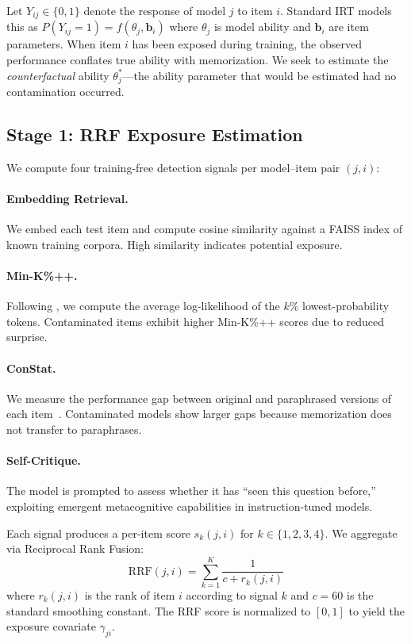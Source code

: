 \documentclass[11pt,letterpaper]{article}
\begin{document}
Let $Y_{ij} \in \{0,1\}$ denote the response of model $j$ to item $i$.
Standard IRT models this as $P(Y_{ij}=1) = f(\theta_j, \mathbf{b}_i)$ where $\theta_j$ is model ability and $\mathbf{b}_i$ are item parameters.
When item $i$ has been exposed during training, the observed performance conflates true ability with memorization.
We seek to estimate the \emph{counterfactual} ability $\theta_j^*$---the ability parameter that would be estimated had no contamination occurred.

\subsection{Stage 1: RRF Exposure Estimation}

We compute four training-free detection signals per model--item pair $(j,i)$:

\paragraph{Embedding Retrieval.} We embed each test item and compute cosine similarity against a FAISS index of known training corpora. High similarity indicates potential exposure.

\paragraph{Min-K\%++.} Following \citet{shi2024detecting}, we compute the average log-likelihood of the $k$\% lowest-probability tokens. Contaminated items exhibit higher Min-K\%++ scores due to reduced surprise.

\paragraph{ConStat.} We measure the performance gap between original and paraphrased versions of each item~\citep{dekoninck2024constat}. Contaminated models show larger gaps because memorization does not transfer to paraphrases.

\paragraph{Self-Critique.} The model is prompted to assess whether it has ``seen this question before,'' exploiting emergent metacognitive capabilities in instruction-tuned models.

Each signal produces a per-item score $s_k(j,i)$ for $k \in \{1,2,3,4\}$.
We aggregate via Reciprocal Rank Fusion:
\begin{equation}
\text{RRF}(j,i) = \sum_{k=1}^{K} \frac{1}{c + r_k(j,i)}
\end{equation}
where $r_k(j,i)$ is the rank of item $i$ according to signal $k$ and $c=60$ is the standard smoothing constant.
The RRF score is normalized to $[0,1]$ to yield the exposure covariate $\gamma_{ji}$.
\end{document}
